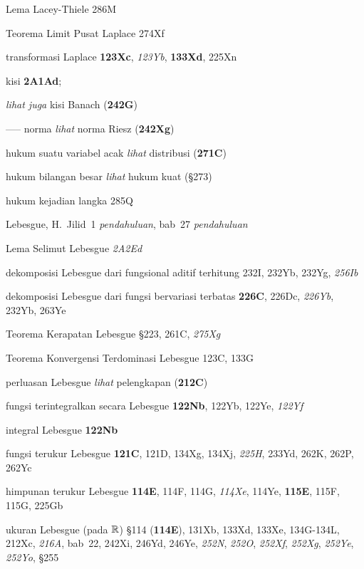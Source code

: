 



\indexmedskip

Lema Lacey-Thiele 286M


Teorema Limit Pusat Laplace 274Xf


transformasi Laplace {\bf 123Xc}, {\it 123Yb}, {\bf 133Xd},
  225Xn










kisi {\bf 2A1Ad}; 

  {\it lihat juga}
kisi Banach ({\bf 242G})




----- norma {\it lihat} norma Riesz ({\bf 242Xg})




hukum suatu variabel acak {\it lihat} distribusi ({\bf 271C})


hukum bilangan besar {\it lihat} hukum kuat (\S273)


hukum kejadian langka 285Q




Lebesgue, H.\   Jilid\ 1 {\it pendahuluan}, bab\ 27 {\it pendahuluan}

Lema Selimut Lebesgue {\it 2A2Ed}


dekomposisi Lebesgue dari fungsional aditif terhitung 232I, 232Yb, 232Yg,
{\it 256Ib}


dekomposisi Lebesgue dari fungsi bervariasi terbatas {\bf
226C}, 226Dc, {\it 226Yb}, 232Yb, 263Ye




Teorema Kerapatan Lebesgue \S223, 261C, {\it 275Xg}


Teorema Konvergensi Terdominasi Lebesgue 123C, 133G

perluasan Lebesgue {\it lihat} pelengkapan ({\bf 212C})


fungsi terintegralkan secara Lebesgue {\bf 122Nb}, 122Yb, 122Ye, {\it
122Yf}

integral Lebesgue {\bf 122Nb}

fungsi terukur Lebesgue {\bf 121C}, 121D, 134Xg, 134Xj,
  {\it 225H}, 233Yd, 262K, 262P, 262Yc
  

himpunan terukur Lebesgue {\bf 114E}, 114F, 114G, {\it 114Xe}, 114Ye, {\bf
115E}, 115F, 115G, 225Gb

ukuran Lebesgue (pada $\Bbb R$) \S114 ({\bf 114E}), 131Xb, 133Xd, 133Xe,
134G-134L, 
  212Xc, {\it 216A}, bab\ 22, 242Xi, 246Yd, 246Ye,
{\it 252N}, {\it 252O},
{\it 252Xf}, {\it 252Xg}, {\it 252Ye}, {\it 252Yo}, \S255


